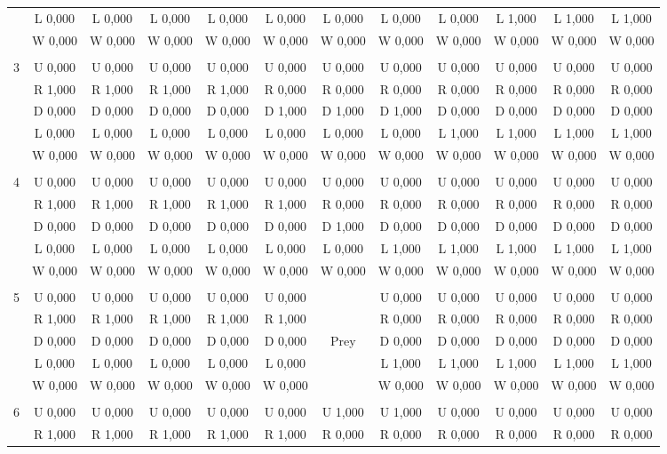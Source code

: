 \begin{table}[htbp]
\begin{tiny}
\begin{tabular}{c|c|c|c|c|c|c|c|c|c|c|c|}
&L 0,000&L 0,000&L 0,000&L 0,000&L 0,000&L 0,000&L 0,000&L 0,000&L 1,000&L 1,000&L 1,000\\
&W 0,000&W 0,000&W 0,000&W 0,000&W 0,000&W 0,000&W 0,000&W 0,000&W 0,000&W 0,000&W 0,000\\
\hline \\
3&U 0,000&U 0,000&U 0,000&U 0,000&U 0,000&U 0,000&U 0,000&U 0,000&U 0,000&U 0,000&U 0,000\\
&R 1,000&R 1,000&R 1,000&R 1,000&R 0,000&R 0,000&R 0,000&R 0,000&R 0,000&R 0,000&R 0,000\\
&D 0,000&D 0,000&D 0,000&D 0,000&D 1,000&D 1,000&D 1,000&D 0,000&D 0,000&D 0,000&D 0,000\\
&L 0,000&L 0,000&L 0,000&L 0,000&L 0,000&L 0,000&L 0,000&L 1,000&L 1,000&L 1,000&L 1,000\\
&W 0,000&W 0,000&W 0,000&W 0,000&W 0,000&W 0,000&W 0,000&W 0,000&W 0,000&W 0,000&W 0,000\\
\hline \\
4&U 0,000&U 0,000&U 0,000&U 0,000&U 0,000&U 0,000&U 0,000&U 0,000&U 0,000&U 0,000&U 0,000\\
&R 1,000&R 1,000&R 1,000&R 1,000&R 1,000&R 0,000&R 0,000&R 0,000&R 0,000&R 0,000&R 0,000\\
&D 0,000&D 0,000&D 0,000&D 0,000&D 0,000&D 1,000&D 0,000&D 0,000&D 0,000&D 0,000&D 0,000\\
&L 0,000&L 0,000&L 0,000&L 0,000&L 0,000&L 0,000&L 1,000&L 1,000&L 1,000&L 1,000&L 1,000\\
&W 0,000&W 0,000&W 0,000&W 0,000&W 0,000&W 0,000&W 0,000&W 0,000&W 0,000&W 0,000&W 0,000\\
\hline \\
5&U 0,000&U 0,000&U 0,000&U 0,000&U 0,000&&U 0,000&U 0,000&U 0,000&U 0,000&U 0,000\\
&R 1,000&R 1,000&R 1,000&R 1,000&R 1,000&&R 0,000&R 0,000&R 0,000&R 0,000&R 0,000\\
&D 0,000&D 0,000&D 0,000&D 0,000&D 0,000&Prey&D 0,000&D 0,000&D 0,000&D 0,000&D 0,000\\
&L 0,000&L 0,000&L 0,000&L 0,000&L 0,000&&L 1,000&L 1,000&L 1,000&L 1,000&L 1,000\\
&W 0,000&W 0,000&W 0,000&W 0,000&W 0,000&&W 0,000&W 0,000&W 0,000&W 0,000&W 0,000\\
\hline \\
6&U 0,000&U 0,000&U 0,000&U 0,000&U 0,000&U 1,000&U 1,000&U 0,000&U 0,000&U 0,000&U 0,000\\
&R 1,000&R 1,000&R 1,000&R 1,000&R 1,000&R 0,000&R 0,000&R 0,000&R 0,000&R 0,000&R 0,000\\

\end{tabular}
\end{tiny}
\end{table}
